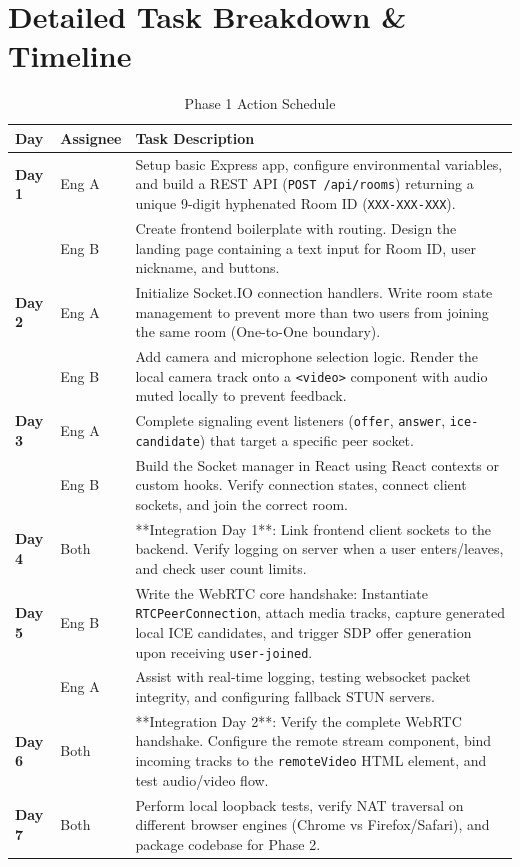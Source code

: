 \documentclass[11pt,a4paper]{article}
\begin{document}
\newpage

\section{Detailed Task Breakdown \& Timeline}

\begin{table}[h!]
\centering
\begin{tabular}{@{}llp{8cm}@{}}
\toprule
\textbf{Day} & \textbf{Assignee} & \textbf{Task Description} \\ \midrule
\textbf{Day 1} & Eng A & Setup basic Express app, configure environmental variables, and build a REST API (\texttt{POST /api/rooms}) returning a unique 9-digit hyphenated Room ID (\texttt{XXX-XXX-XXX}). \\
& Eng B & Create frontend boilerplate with routing. Design the landing page containing a text input for Room ID, user nickname, and buttons. \\ \midrule
\textbf{Day 2} & Eng A & Initialize Socket.IO connection handlers. Write room state management to prevent more than two users from joining the same room (One-to-One boundary). \\
& Eng B & Add camera and microphone selection logic. Render the local camera track onto a \texttt{<video>} component with audio muted locally to prevent feedback. \\ \midrule
\textbf{Day 3} & Eng A & Complete signaling event listeners (\texttt{offer}, \texttt{answer}, \texttt{ice-candidate}) that target a specific peer socket. \\
& Eng B & Build the Socket manager in React using React contexts or custom hooks. Verify connection states, connect client sockets, and join the correct room. \\ \midrule
\textbf{Day 4} & Both & **Integration Day 1**: Link frontend client sockets to the backend. Verify logging on server when a user enters/leaves, and check user count limits. \\ \midrule
\textbf{Day 5} & Eng B & Write the WebRTC core handshake: Instantiate \texttt{RTCPeerConnection}, attach media tracks, capture generated local ICE candidates, and trigger SDP offer generation upon receiving \texttt{user-joined}. \\
& Eng A & Assist with real-time logging, testing websocket packet integrity, and configuring fallback STUN servers. \\ \midrule
\textbf{Day 6} & Both & **Integration Day 2**: Verify the complete WebRTC handshake. Configure the remote stream component, bind incoming tracks to the \texttt{remoteVideo} HTML element, and test audio/video flow. \\ \midrule
\textbf{Day 7} & Both & Perform local loopback tests, verify NAT traversal on different browser engines (Chrome vs Firefox/Safari), and package codebase for Phase 2. \\ \bottomrule
\end{tabular}
\caption{Phase 1 Action Schedule}
\label{tab:schedule}
\end{table}
\end{document}
